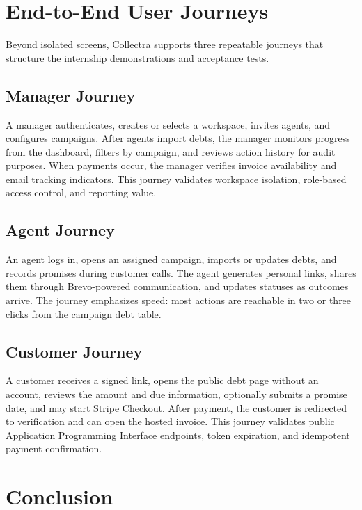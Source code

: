 \documentclass[12pt,a4paper]{report}
\begin{document}
\section{End-to-End User Journeys}
\label{sec:user-journeys}

Beyond isolated screens, Collectra supports three repeatable journeys that structure the
internship demonstrations and acceptance tests.

\subsection{Manager Journey}

A manager authenticates, creates or selects a workspace, invites agents, and configures campaigns.
After agents import debts, the manager monitors progress from the dashboard, filters by campaign,
and reviews action history for audit purposes.
When payments occur, the manager verifies invoice availability and email tracking indicators.
This journey validates workspace isolation, role-based access control, and reporting value.

\subsection{Agent Journey}

An agent logs in, opens an assigned campaign, imports or updates debts, and records promises
during customer calls.
The agent generates personal links, shares them through Brevo-powered communication, and updates
statuses as outcomes arrive.
The journey emphasizes speed: most actions are reachable in two or three clicks from the campaign
debt table.

\subsection{Customer Journey}

A customer receives a signed link, opens the public debt page without an account, reviews the
amount and due information, optionally submits a promise date, and may start Stripe Checkout.
After payment, the customer is redirected to verification and can open the hosted invoice.
This journey validates public Application Programming Interface endpoints, token expiration, and
idempotent payment confirmation.

\section*{Conclusion}
{}
\end{document}

